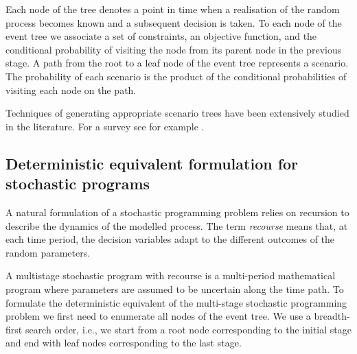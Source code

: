 Each node of the tree denotes a point in time when a realisation 
of the random process becomes known and a subsequent decision is taken.
To each node of the event tree we associate a set of constraints, an 
objective function, and the conditional probability of visiting the 
node from its parent node in the previous stage.
A path from the root to a leaf node of the event tree represents a 
scenario. The probability of each scenario is the product of the 
conditional probabilities of visiting each node on the path.

Techniques of generating appropriate scenario trees have been extensively
studied in the literature. For a survey see for example \cite{HoylandWallace}.


%
%
\subsection{Deterministic equivalent formulation for stochastic programs}
\label{DetEqForm}

A natural formulation of a stochastic programming problem relies on 
recursion to describe the dynamics of the modelled process.
The term {\it recourse} means that, at each time period, the decision 
variables adapt to the different outcomes of the random parameters.

A multistage stochastic program with recourse is a multi-period 
mathematical program where parameters are assumed to be uncertain 
along the time path.
%
To formulate the deterministic equivalent of the multi-stage 
stochastic programming problem we first need to enumerate all nodes 
of the event tree. We use a breadth-first 
search order, i.e., we start from a root node corresponding 
to the initial stage and end with leaf nodes corresponding 
to the last stage.

